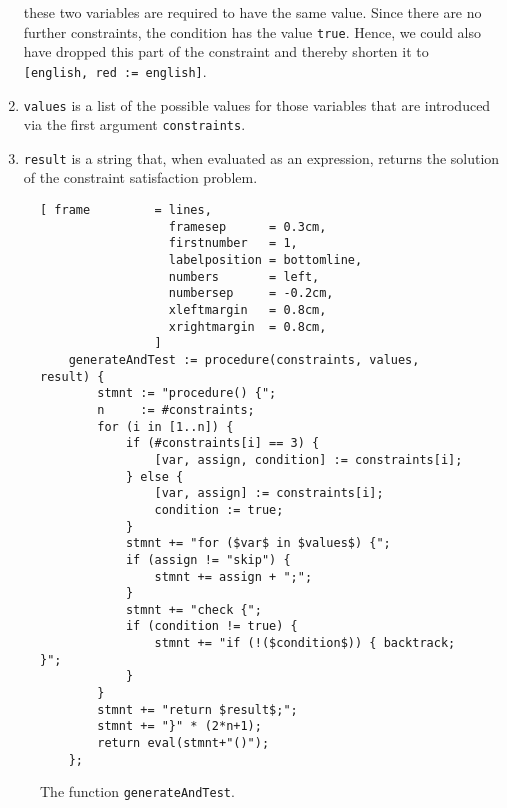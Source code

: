 \begin{enumerate}
      these two variables are required to have
      the same value. Since there are no further constraints, the condition has the value
      \texttt{true}.  Hence, we could also have dropped this part of the constraint and thereby
      shorten it to
      \\[0.2cm]
      \hspace*{1.3cm}
      \texttt{[english, red := english]}.
\item \texttt{values} is a list of the possible values for those variables that are introduced via
      the first argument \texttt{constraints}.
\item \texttt{result} is a string that, when evaluated as an expression, returns the solution of the
      constraint satisfaction problem.
\end{enumerate}

\begin{figure}[!ht]
\centering
\begin{Verbatim}[ frame         = lines, 
                  framesep      = 0.3cm, 
                  firstnumber   = 1,
                  labelposition = bottomline,
                  numbers       = left,
                  numbersep     = -0.2cm,
                  xleftmargin   = 0.8cm,
                  xrightmargin  = 0.8cm,
                ]
    generateAndTest := procedure(constraints, values, result) {
        stmnt := "procedure() {";
        n     := #constraints;
        for (i in [1..n]) {
            if (#constraints[i] == 3) {
                [var, assign, condition] := constraints[i];
            } else {
                [var, assign] := constraints[i];
                condition := true;
            }
            stmnt += "for ($var$ in $values$) {";
            if (assign != "skip") {
                stmnt += assign + ";";
            }
            stmnt += "check {";
            if (condition != true) {
                stmnt += "if (!($condition$)) { backtrack; }";
            }
        }
        stmnt += "return $result$;";
        stmnt += "}" * (2*n+1);
        return eval(stmnt+"()");
    };
\end{Verbatim}
\vspace*{-0.3cm}
\caption{The function \texttt{generateAndTest}.}
\label{fig:generateAndTest.stlx}
\end{figure}

